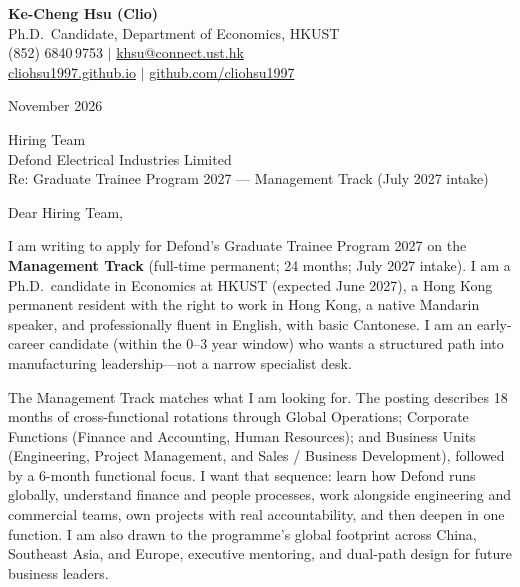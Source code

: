 \documentclass[11pt,letterpaper]{article}
\begin{document}
\noindent
{\bfseries Ke-Cheng Hsu (Clio)}\\
Ph.D.\ Candidate, Department of Economics, HKUST\\
(852) 6840\,9753 \quad $|$ \quad \href{mailto:khsu@connect.ust.hk}{khsu@connect.ust.hk}\\
\href{https://cliohsu1997.github.io/}{cliohsu1997.github.io} \quad $|$ \quad \href{https://github.com/cliohsu1997}{github.com/cliohsu1997}

\vspace{0.35em}
 November 2026

\vspace{0.25em}
\noindent
Hiring Team\\
Defond Electrical Industries Limited\\
Re: Graduate Trainee Program 2027 --- Management Track (July 2027 intake)

\vspace{0.1em}
Dear Hiring Team,

I am writing to apply for Defond's Graduate Trainee Program 2027 on the \textbf{Management Track} (full-time permanent; 24 months; July 2027 intake). I am a Ph.D.\ candidate in Economics at HKUST (expected June 2027), a Hong Kong permanent resident with the right to work in Hong Kong, a native Mandarin speaker, and professionally fluent in English, with basic Cantonese. I am an early-career candidate (within the 0--3 year window) who wants a structured path into manufacturing leadership---not a narrow specialist desk.

The Management Track matches what I am looking for. The posting describes 18 months of cross-functional rotations through Global Operations; Corporate Functions (Finance and Accounting, Human Resources); and Business Units (Engineering, Project Management, and Sales / Business Development), followed by a 6-month functional focus. I want that sequence: learn how Defond runs globally, understand finance and people processes, work alongside engineering and commercial teams, own projects with real accountability, and then deepen in one function. I am also drawn to the programme's global footprint across China, Southeast Asia, and Europe, executive mentoring, and dual-path design for future business leaders.
\end{document}
